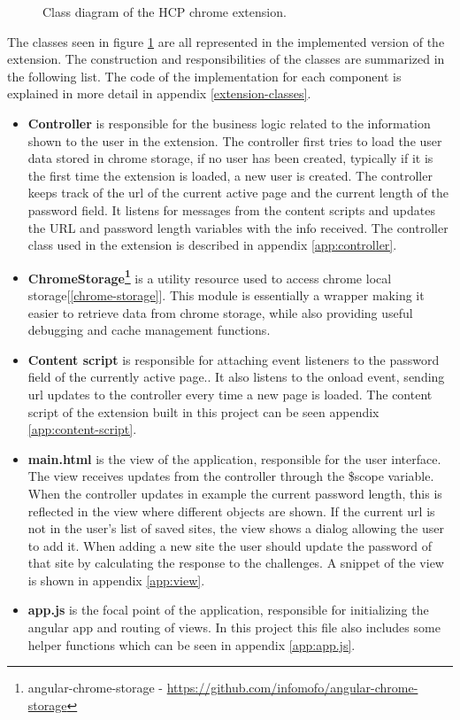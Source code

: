 \begin{figure}[ht]
    \centering
    \caption{Class diagram of the HCP chrome extension.}
    \label{class-diagram}
\end{figure}

\par The classes seen in figure \ref{class-diagram} are all represented in the implemented version of the extension. The construction and responsibilities of the classes are summarized in the following list. The code of the implementation for each component is explained in more detail in appendix \ref{extension-classes}.

\begin{itemize}
    \item \textbf{Controller} is responsible for the business logic related to the information shown to the user in the extension. The controller first tries to load the user data stored in chrome storage, if no user has been created, typically if it is the first time the extension is loaded, a new user is created. The controller keeps track of the url of the current active page and the current length of the password field. It listens for messages from the content scripts and updates the URL and password length variables with the info received. The controller class used in the extension is described in appendix \ref{app:controller}.
    \item \textbf{ChromeStorage\footnote{angular-chrome-storage - \url{https://github.com/infomofo/angular-chrome-storage}}} is a utility resource used to access chrome local storage[\autoref{chrome-storage}]. This module is essentially a wrapper making it easier to retrieve data from chrome storage, while also providing useful debugging and cache management functions.
    \item \textbf{Content script} is responsible for attaching event listeners to the password field of the currently active page.. It also listens to the onload event, sending url updates to the controller every time a new page is loaded. The content script of the extension built in this project can be seen appendix \ref{app:content-script}.
    \item \textbf{main.html} is the view of the application, responsible for the user interface. The view receives updates from the controller through the \$scope variable. When the controller updates in example the current password length, this is reflected in the view where different objects are shown. If the current url is not in the user's list of saved sites, the view shows a dialog allowing the user to add it. When adding a new site the user should update the password of that site by calculating the response to the challenges. A snippet of the view is shown in appendix \ref{app:view}. 
    \item \textbf{app.js} is the focal point of the application, responsible for initializing the angular app and routing of views. In this project this file also includes some helper functions which can be seen in appendix \ref{app:app.js}.
\end{itemize}

